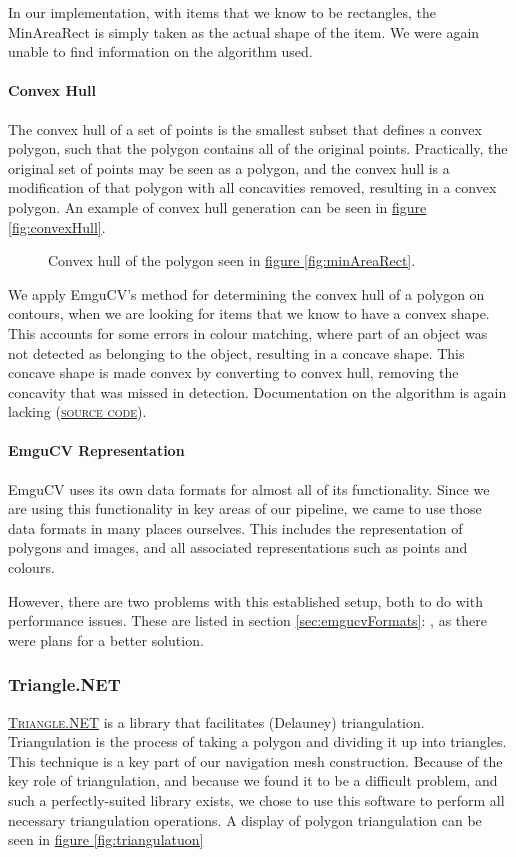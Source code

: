 \documentclass[10pt,twocolumn]{scrartcl}
\newcommand{\fref}[1]{\hyperref[#1]{figure \vref{#1}}}
\newcommand{\sref}[1]{section \vref{#1}: \nameref{#1}}
\newcommand{\link}[2]{\textsc{\href{#1}{#2}}}
\begin{document}
In our implementation, with items that we know to be rectangles, the MinAreaRect is simply taken as the actual shape of the item. We were again unable to find information on the algorithm used.

\paragraph{Convex Hull}
The convex hull of a set of points is the smallest subset that defines a convex polygon, such that the polygon contains all of the original points. Practically, the original set of points may be seen as a polygon, and the convex hull is a modification of that polygon with all concavities removed, resulting in a convex polygon. An example of convex hull generation can be seen in \fref{fig:convexHull}.

\begin{figure}
	\centering
	
	\caption{\small Convex hull of the polygon seen in \fref{fig:minAreaRect}.}
	\label{fig:convexHull}
\end{figure}

We apply EmguCV's method for determining the convex hull of a polygon on contours, when we are looking for items that we know to have a convex shape. This accounts for some errors in colour matching, where part of an object was not detected as belonging to the object, resulting in a concave shape. This concave shape is made convex by converting to convex hull, removing the concavity that was missed in detection. Documentation on the algorithm is again lacking (\link{https://github.com/Itseez/opencv/blob/ef91d7e8830c36785f0b6fdbf2045da48413dd76/modules/imgproc/src/convhull.cpp\#L129}{source code}).

\paragraph{EmguCV Representation}
EmguCV uses its own data formats for almost all of its functionality. Since we are using this functionality in key areas of our pipeline, we came to use those data formats in many places ourselves. This includes the representation of polygons and images, and all associated representations such as points and colours.

However, there are two problems with this established setup, both to do with performance issues. These are listed in \sref{sec:emgucvFormats}, as there were plans for a better solution.

\subsubsection{Triangle.NET}
\link{http://triangle.codeplex.com/}{Triangle.NET} is a library that facilitates (Delauney) triangulation. Triangulation is the process of taking a polygon and dividing it up into triangles. This technique is a key part of our navigation mesh construction. Because of the key role of triangulation, and because we found it to be a difficult problem, and such a perfectly-suited library exists, we chose to use this software to perform all necessary triangulation operations. A display of polygon triangulation can be seen in \fref{fig:triangulatuon}
\end{document}
